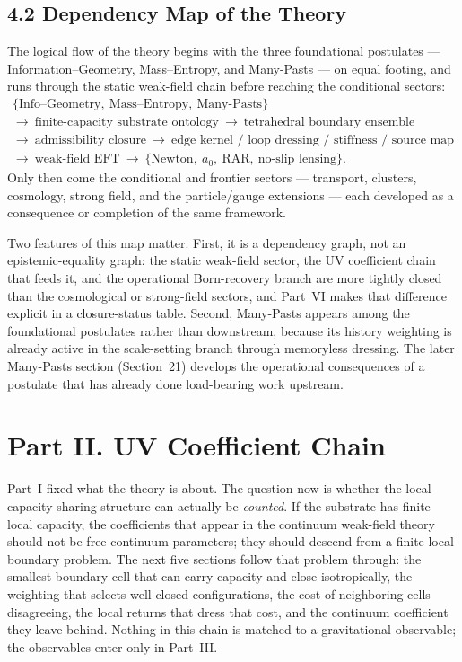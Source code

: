 \documentclass[11pt]{article}
\begin{document}
\subsection{4.2 Dependency Map of the Theory}

The logical flow of the theory begins with the three foundational postulates --- Information--Geometry, Mass--Entropy, and Many-Pasts --- on equal footing, and runs through the static weak-field chain before reaching the conditional sectors:
\[
\begin{gathered}
\{\text{Info--Geometry},\ \text{Mass--Entropy},\ \text{Many-Pasts}\}\\
\rightarrow\ \text{finite-capacity substrate ontology}
\ \rightarrow\ \text{tetrahedral boundary ensemble}\\
\rightarrow\ \text{admissibility closure}
\ \rightarrow\ \text{edge kernel / loop dressing / stiffness / source map}\\
\rightarrow\ \text{weak-field EFT}
\ \rightarrow\ \{\text{Newton},\ a_0,\ \text{RAR},\ \text{no-slip lensing}\}.
\end{gathered}
\]
Only then come the conditional and frontier sectors --- transport, clusters, cosmology, strong field, and the particle/gauge extensions --- each developed as a consequence or completion of the same framework.

Two features of this map matter. First, it is a dependency graph, not an epistemic-equality graph: the static weak-field sector, the UV coefficient chain that feeds it, and the operational Born-recovery branch are more tightly closed than the cosmological or strong-field sectors, and Part~VI makes that difference explicit in a closure-status table. Second, Many-Pasts appears among the foundational postulates rather than downstream, because its history weighting is already active in the scale-setting branch through memoryless dressing. The later Many-Pasts section (Section~21) develops the operational consequences of a postulate that has already done load-bearing work upstream.

\section*{Part II. UV Coefficient Chain}

Part~I fixed what the theory is about. The question now is whether the local capacity-sharing structure can actually be \emph{counted}. If the substrate has finite local capacity, the coefficients that appear in the continuum weak-field theory should not be free continuum parameters; they should descend from a finite local boundary problem. The next five sections follow that problem through: the smallest boundary cell that can carry capacity and close isotropically, the weighting that selects well-closed configurations, the cost of neighboring cells disagreeing, the local returns that dress that cost, and the continuum coefficient they leave behind. Nothing in this chain is matched to a gravitational observable; the observables enter only in Part~III.
\end{document}
